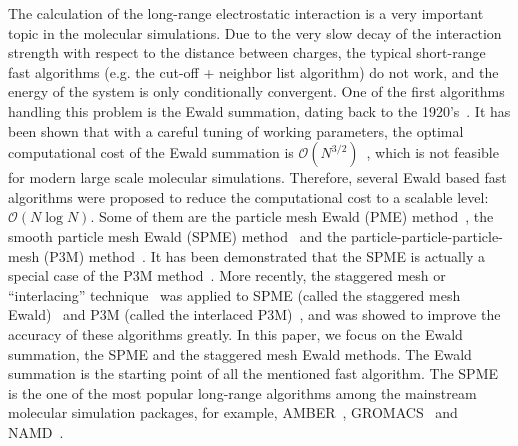 \documentclass[journal=jacsat,manuscript=article]{achemso}
\newcommand{\recheck}[1]{{\color{black} #1}}
\begin{document}
The calculation of the long-range electrostatic interaction is a very
important topic in the molecular simulations.  Due to the very slow
decay of the interaction strength with respect to the distance between charges,
the typical short-range fast algorithms (e.g. the cut-off + neighbor list
algorithm) do not work, and the
energy of the system is only conditionally convergent.  One of the
first algorithms handling this problem is the Ewald summation, dating
back to the 1920's~\cite{ewald1921die}.  It has been shown that
with a careful tuning of working parameters, the optimal computational
cost of the Ewald summation is  $\mathcal
O(N^{3/2})$~\cite{perram1988asc}, which is not feasible for modern
large scale molecular simulations.
Therefore, several Ewald based fast algorithms were proposed to reduce the
computational cost to a scalable level: $\mathcal O(N\log N)$. Some of them
are
the particle mesh Ewald (PME)
method~\cite{darden1993pme}, the smooth particle mesh Ewald (SPME)
method~\cite{essmann1995spm} and the particle-particle-particle-mesh
(P3M) method~\cite{hockney1988computer, deserno1998mue1}.
\recheck{
It has been demonstrated that the SPME is actually
a special case of the P3M method~\cite{deserno1998mue1, ballenegger2012convert}.}
More recently, the staggered mesh or
``interlacing'' technique~\cite{chen1974reduction,eastwood1976optimal}
was applied to SPME
(called the staggered mesh Ewald)~\cite{cerutti2009staggered} and P3M
(called the interlaced P3M)~\cite{neelov2010interlaced}, and was showed to
improve the accuracy of these algorithms greatly.
In this paper, we focus on the Ewald summation, the SPME and
the staggered mesh Ewald methods. The Ewald summation is the starting
point of all the mentioned fast algorithm. The SPME
is the one of the most popular long-range algorithms among
the mainstream molecular simulation packages, for example,
AMBER~\cite{case2005amber}, GROMACS~\cite{van2005gromacs,
  hess2008gromacs} and NAMD~\cite{phillips2005scalable}.
\end{document}
